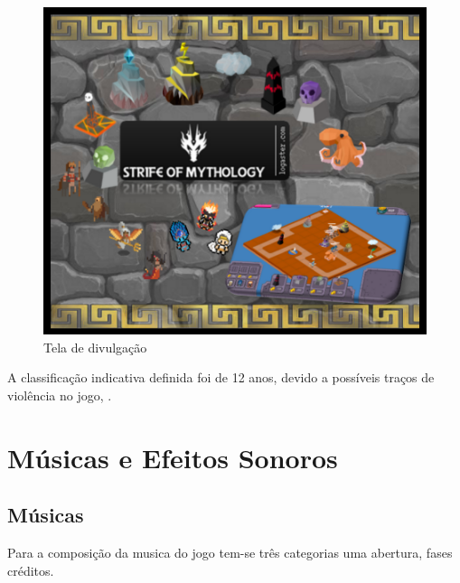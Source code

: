 \documentclass[11pt]{article} %
\begin{document}
\begin{figure}[!htp]
\centering
\includegraphics[scale=0.3]{res/capa_do_jogo.png}
\caption{Tela de divulgação}
\label{Classificação Indicativa}
\end{figure}

A classificação indicativa definida foi de 12 anos, devido a possíveis traços de violência no jogo, . 


\newpage

\section{Músicas e Efeitos Sonoros}
\subsection{Músicas}
Para a composição da musica do jogo tem-se três categorias uma abertura, fases créditos. 
\end{document}

